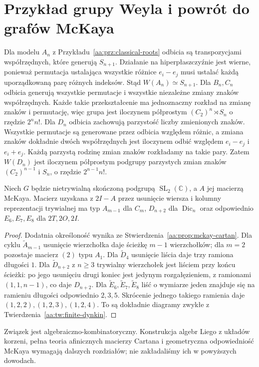 \section{Przykład grupy Weyla i powrót do grafów McKaya}

\begin{przyklad}
Dla modelu $A_n$ z Przykładu~\ref{aa:prz:classical-roots}
odbicia są transpozycjami współrzędnych, które
generują $S_{n+1}$. Działanie na hiperpłaszczyźnie
jest wierne, ponieważ permutacja ustalająca wszystkie
różnice $e_i-e_j$ musi ustalać każdą uporządkowaną
parę różnych indeksów. Stąd $W(A_n)\simeq S_{n+1}$.
Dla $B_n,C_n$ odbicia generują wszystkie permutacje
i wszystkie niezależne zmiany znaków współrzędnych.
Każde takie przekształcenie ma jednoznaczny rozkład
na zmianę znaków i permutację, więc grupa jest
iloczynem półprostym $(C_2)^n\rtimes S_n$
o rzędzie $2^n n!$.
Dla $D_n$ odbicia zachowują parzystość liczby zmienionych
znaków. Wszystkie permutacje są generowane przez
odbicia względem różnic, a zmiana znaków dokładnie
dwóch współrzędnych jest iloczynem odbić względem
$e_i-e_j$ i $e_i+e_j$. Każdą parzystą rodzinę
zmian znaków rozkładamy na takie pary.
Zatem $W(D_n)$ jest iloczynem półprostym podgrupy
parzystych zmian znaków $(C_2)^{n-1}$ i $S_n$,
o rzędzie $2^{n-1}n!$.
\end{przyklad}

\begin{wniosek}
\label{aa:cor:mckay-finite-dynkin}
Niech $G$ będzie nietrywialną skończoną podgrupą
$\operatorname{SL}_2(\mathbb C)$, a $A$ jej macierzą
McKaya. Macierz uzyskana z $2I-A$ przez usunięcie
wiersza i kolumny reprezentacji trywialnej ma typ
$A_{m-1}$ dla $C_m$, $D_{n+2}$ dla $\operatorname{Dic}_n$
oraz odpowiednio $E_6,E_7,E_8$ dla $2T,2O,2I$.
\end{wniosek}
\begin{proof}
Dodatnia określoność wynika ze
Stwierdzenia~\ref{aa:prop:mckay-cartan}.
Dla cyklu $\widetilde A_{m-1}$ usunięcie wierzchołka
daje ścieżkę $m-1$ wierzchołków; dla $m=2$
pozostaje macierz $(2)$ typu $A_1$.
Dla $\widetilde D_4$ usunięcie liścia daje trzy
ramiona długości $1$. Dla $\widetilde D_{n+2}$
z $n\ge3$ trywialny wierzchołek jest liściem
przy końcu ścieżki: po jego usunięciu drugi koniec
jest jedynym rozgałęzieniem, z ramionami
$(1,1,n-1)$, co daje $D_{n+2}$.
Dla $\widetilde E_6,\widetilde E_7,\widetilde E_8$
liść o wymiarze jeden znajduje się na ramieniu
długości odpowiednio $2,3,5$. Skrócenie jednego
takiego ramienia daje $(1,2,2),(1,2,3),(1,2,4)$.
To są dokładnie diagramy zwykłe z
Twierdzenia~\ref{aa:tw:finite-dynkin}.
\end{proof}

Związek jest algebraiczno-kombinatoryczny. Konstrukcja
algebr Liego z układów korzeni, pełna teoria afinicznych
macierzy Cartana i geometryczna odpowiedniość McKaya
wymagają dalszych rozdziałów; nie zakładaliśmy ich
w powyższych dowodach.
